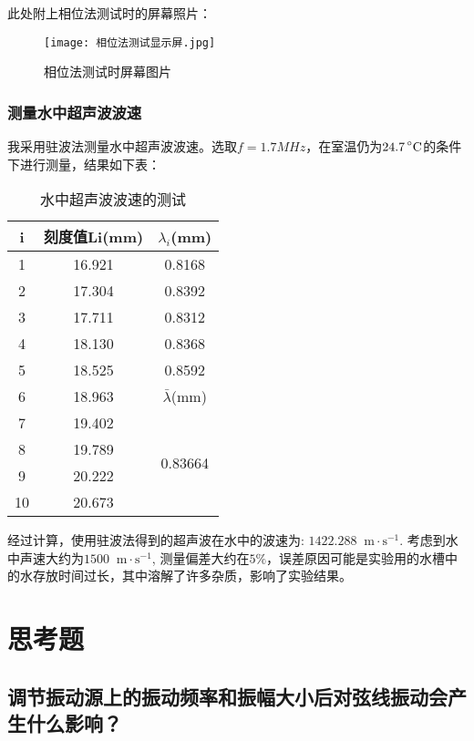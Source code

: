 \documentclass[11pt]{article}
\newcommand*{\unit}[1]{\mathop{}\!\mathrm{#1}}
\newcommand*{\mcelsius}{\unit{\prescript{\circ}{}C}}
\begin{document}
此处附上相位法测试时的屏幕照片：

\begin{figure}[H]
    \centering
    \texttt{[image: 相位法测试显示屏.jpg]}
    \caption{相位法测试时屏幕图片}
\end{figure}

\subsubsection{测量水中超声波波速}

我采用驻波法测量水中超声波波速。选取$f=1.7MHz$，在室温仍为$24.7 \mcelsius$的条件下进行测量，结果如下表：

\begin{table}[H]
    \centering
    \caption{水中超声波波速的测试}
    \begin{tabular}{|c|c|c|}
        \hline
        i&刻度值Li(mm)&$\lambda_i$(mm)\\
        \hline
        1&16.921  & 0.8168 \\
        \hline
        2&17.304  & 0.8392 \\
        \hline
        3&17.711  & 0.8312 \\
        \hline
        4&18.130  & 0.8368 \\
        \hline
        5&18.525  & 0.8592 \\
        \hline
        6&18.963&$\bar{\lambda}$(mm)\\
        \hline
        7&19.402&\multirow{4}{*}{0.83664}\\
        \cline{1-2}
        8&19.789&\\
        \cline{1-2}
        9&20.222&\\
        \cline{1-2}
        10&20.673&\\
        \hline
    \end{tabular}
\end{table}

经过计算，使用驻波法得到的超声波在水中的波速为: $1422.288 \unit{m\cdot s^{-1}}$. 考虑到水中声速大约为$1500 \unit{m\cdot s^{-1}}$, 测量偏差大约在$5 \%$，误差原因可能是实验用的水槽中的水存放时间过长，其中溶解了许多杂质，影响了实验结果。

\section{思考题}

\subsection{调节振动源上的振动频率和振幅大小后对弦线振动会产生什么影响？}
\end{document}
